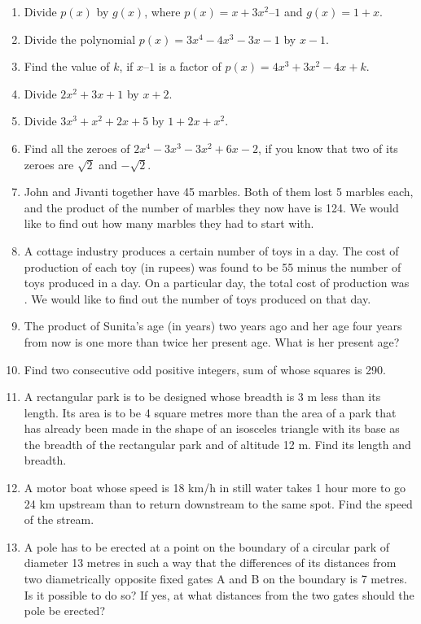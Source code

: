 \renewcommand{\theequation}{\theenumi}
\begin{enumerate}[label=\arabic*.,ref=\thesubsection.\theenumi]
%
\item Divide $p(x)$ by $g(x)$, where $p(x) = x + 3x^2– 1$ and $g(x) = 1 + x$.
\item Divide the polynomial $p(x) = 3x^4-4x^3-3x-1 $ by $x-1$.
\item Find the value of $k$, if $x – 1$ is a factor of $p(x) = 4x^3+ 3x^2 - 4x + k$.
%
\item Divide $2x^2+3x+1$ by $x+2$.
\item Divide $3x^3+x^2+2x+5$ by $1+2x+x^2$.
\item Find all the zeroes of $2x^4-3x^3-3x^2+6x-2$, if you know that two of its zeroes are $\sqrt{2}$ and $-\sqrt{2}$.
\item John and Jivanti together have 45 marbles. Both of them lost 5 marbles each, and the product of the number of marbles they now have is 124. We would like to find out how many marbles they had to start with.
\item  A cottage industry produces a certain number of toys in a day. The cost of production of each toy (in rupees) was found to be 55 minus the number of toys produced in a day. On a particular day, the total cost of production was . We would like to find out the number of toys produced on that day.
\item The product of Sunita’s age (in years) two years ago and her age four years from now is one more than twice her present age. What is her present age?
\item Find two consecutive odd positive integers, sum of whose squares is 290.
\item A rectangular park is to be designed whose breadth is 3 m less than its length. Its area is to be 4 square metres more than the area of a park that has already been made in the shape of an isosceles triangle with its base as the breadth of the rectangular park and of altitude 12 m. Find its length and breadth.
\item A motor boat whose speed is 18 km/h in still water takes 1 hour more to go 24 km upstream than to return downstream to the same spot. Find the speed of the stream.
\item A pole has to be erected at a point on the boundary of a circular park of diameter 13 metres in such a way that the differences of its distances from two diametrically opposite fixed gates A and B on the boundary is 7 metres. Is it possible to do so? If yes, at what distances from the two gates should the pole be erected?

\end{enumerate}
